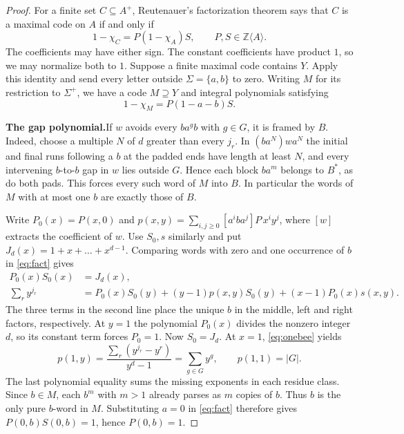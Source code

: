 \documentclass[11pt,a4paper]{article}
\newcommand{\head}[1]{\par\noindent\textbf{#1}\enspace}
\newcommand{\Z}{\mathbb{Z}}
\begin{document}
\begin{proof}
For a finite set $C\subseteq A^+$, Reutenauer's factorization theorem
\cite[\S2, corollary, p.~172]{Reutenauer} says that $C$ is a maximal code on $A$ if and only if
\[
  1-\chi_C=P(1-\chi_A)S,\qquad P,S\in\Z\langle A\rangle.
\]
The coefficients may have either sign. The constant coefficients have product $1$, so we may
normalize both to $1$. Suppose a finite maximal code contains $Y$. Apply this identity and send
every letter outside $\Sigma=\{a,b\}$ to zero. Writing $M$ for its restriction to $\Sigma^+$, we
have a code $M\supseteq Y$ and integral polynomials satisfying
\begin{equation}\label{eq:fact}
  1-\chi_M=P(1-a-b)S.
\end{equation}

\head{The gap polynomial.}If $w$ avoids every $ba^gb$ with $g\in G$, it is framed by $B$. Indeed,
choose a multiple $N$ of $d$ greater than every $j_r$. In $(ba^N)wa^N$ the initial and final runs
following a $b$ at the padded ends have length at least $N$, and every intervening $b$-to-$b$ gap
in $w$ lies outside $G$. Hence each block $ba^m$ belongs to $B^*$, as do both pads. This forces
every such word of $M$ into $B$. In particular the words of $M$ with at most one $b$ are exactly
those of $B$.

Write $P_0(x)=P(x,0)$ and $p(x,y)=\sum_{i,j\ge0}[a^iba^j]P\,x^iy^j$, where $[w]$ extracts the
coefficient of $w$. Use $S_0,s$ similarly and put $J_d(x)=1+x+\dots+x^{d-1}$. Comparing words
with zero and one occurrence of $b$ in \eqref{eq:fact} gives
\begin{equation}\label{eq:onebee}
\begin{aligned}
  P_0(x)S_0(x)&=J_d(x),\\
  \textstyle\sum_r y^{j_r}&=P_0(x)S_0(y)+(y-1)p(x,y)S_0(y)+(x-1)P_0(x)s(x,y).
\end{aligned}
\end{equation}
The three terms in the second line place the unique $b$ in the middle, left and right factors,
respectively. At $y=1$ the polynomial $P_0(x)$ divides the nonzero integer $d$, so its constant
term forces $P_0=1$. Now $S_0=J_d$. At $x=1$, \eqref{eq:onebee} yields
\begin{equation}\label{eq:gaps}
  p(1,y)=\frac{\sum_r(y^{j_r}-y^r)}{y^d-1}=\sum_{g\in G}y^g,\qquad p(1,1)=|G|.
\end{equation}
The last polynomial equality sums the missing exponents in each residue class. Since $b\in M$,
each $b^m$ with $m>1$ already parses as $m$ copies of $b$. Thus $b$ is the only pure $b$-word in
$M$. Substituting $a=0$ in \eqref{eq:fact} therefore gives $P(0,b)S(0,b)=1$, hence $P(0,b)=1$.


\end{proof}
\end{document}
